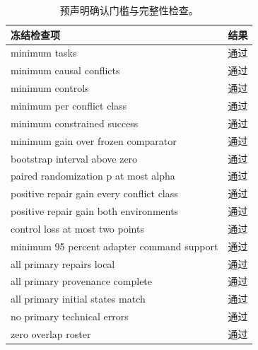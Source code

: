 \begin{table}[t]
\centering
\small
\caption{预声明确认门槛与完整性检查。}
\begin{tabular}{lr}
\toprule
冻结检查项 & 结果 \\
\midrule
minimum tasks & 通过 \\
minimum causal conflicts & 通过 \\
minimum controls & 通过 \\
minimum per conflict class & 通过 \\
minimum constrained success & 通过 \\
minimum gain over frozen comparator & 通过 \\
bootstrap interval above zero & 通过 \\
paired randomization p at most alpha & 通过 \\
positive repair gain every conflict class & 通过 \\
positive repair gain both environments & 通过 \\
control loss at most two points & 通过 \\
minimum 95 percent adapter command support & 通过 \\
all primary repairs local & 通过 \\
all primary provenance complete & 通过 \\
all primary initial states match & 通过 \\
no primary technical errors & 通过 \\
zero overlap roster & 通过 \\
\bottomrule
\end{tabular}
\end{table}
